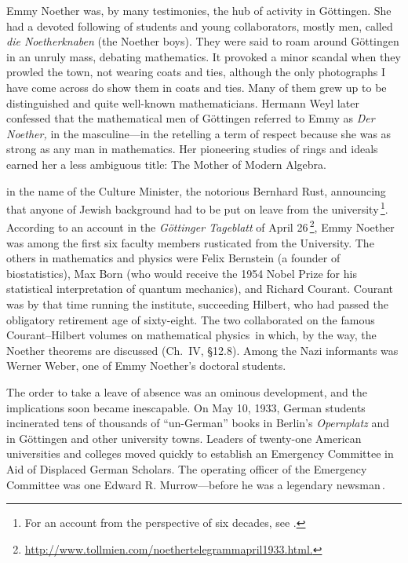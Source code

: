 \documentclass[twoside,symmetric]{tufte-handout}
\begin{document}
Emmy Noether was, by many testimonies, the hub of activity in G\"ottingen. She had a devoted following of students and young collaborators, mostly men, called \emph{die Noetherknaben} (the Noether boys). They were said to roam around G\"ottingen in an unruly mass, debating mathematics. It provoked a minor scandal when they prowled the town, not wearing coats and ties, although the only photographs I have come across do show them in coats and ties. Many of them grew up to be distinguished and quite well-known mathematicians. Hermann Weyl later confessed that the mathematical men of G\"ottingen referred to Emmy as \emph{Der Noether,} in the masculine---in the retelling a term of respect because she was as strong as any man in mathematics. Her pioneering studies of rings and ideals earned her a less ambiguous title: The Mother of Modern Algebra.

 in the name of the Culture Minister, the notorious Bernhard Rust, announcing that anyone of Jewish background had to be put on leave from the university$\,$\footnote[][-12pt]{For an account from the perspective of six decades, see .}. According to an account in the \emph{G\"ottinger Tageblatt} of April 26$\,$\footnote{\url{http://www.tollmien.com/noethertelegrammapril1933.html.}}, Emmy Noether was among the first six faculty members rusticated from the University. The others in mathematics and physics were Felix Bernstein (a founder of biostatistics), Max Born (who would receive the 1954 Nobel Prize for his statistical interpretation of quantum mechanics), and Richard Courant. Courant was by that time running the institute, succeeding Hilbert, who had passed the obligatory retirement age of sixty-eight. The two collaborated on the famous Courant--Hilbert volumes on mathematical physics$\,$\cite{9780470179529} in which, by the way, the Noether theorems are discussed (Ch.~IV, \S12.8).
Among the Nazi informants was Werner Weber, one of Emmy Noether's doctoral students.

The order to take a leave of absence was an ominous development, and the implications soon became inescapable. On May 10, 1933, German students incinerated tens of thousands of ``un-German'' books in Berlin's \emph{Opernplatz} and in G\"ottingen and other university towns. Leaders of twenty-one American universities and colleges moved quickly to establish an Emergency Committee in Aid of Displaced German Scholars. The operating officer of the Emergency Committee was one Edward R. Murrow---before he was a legendary newsman$\,$\cite[-60pt]{MurrowIIE}.
\end{document}
